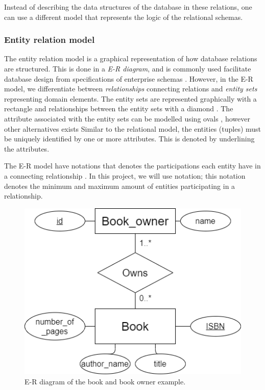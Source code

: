Instead of describing the data structures of the database in these relations, one can use a different model that represents the logic of the relational schemas.

\subsubsection{Entity relation model}\label{sec:EntityRelationModel}
The entity relation model is a graphical representation of how database relations are structured.
This is done in a \textit{E-R diagram}, and is commonly used facilitate database design from specifications of enterprise schemas \cite*[Chapter 6.2]{DBSBook}.
However, in the E-R model, we differentiate between \textit{relationships} connecting relations and \textit{entity sets} representing domain elements. 
The entity sets are represented graphically with a rectangle and relationships between the entity sets with a diamond \cite[Chapter 6.2]{DBSBook}.
The attribute associated with the entity sets can be modelled using ovals \cite{KatjaFirstPP}, however other alternatives exists 
Similar to the relational model, the entities (tuples) must be uniquely identified by one or more attributes. This is denoted by underlining the attributes. 

The E-R model have notations that denotes the participations each entity have in a connecting relationship \cite[Chapter 6.4]{DBSBook}.
In this project, we will use  notation; this notation denotes the minimum and maximum amount of entities participating in a relationship. 

\begin{figure}[htp]
    \centering
    \includegraphics[scale=0.5]{Images/book_example_w_cardinality.png}
    \caption{E-R diagram of the book and book owner example.}
    \label{fig:ER_Book_Example}
\end{figure}

